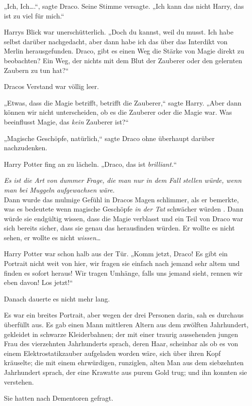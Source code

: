 {„Ich, Ich….“, sagte Draco. Seine Stimme versagte. „Ich kann das nicht Harry, das ist zu viel für mich.“

Harrys Blick war unerschütterlich. „Doch du kannst, weil du musst. Ich habe selbst darüber nachgedacht, aber dann habe ich das über das Interdikt von Merlin herausgefunden. Draco, gibt es einen Weg die Stärke von Magie direkt zu beobachten? Ein Weg, der nichts mit dem Blut der Zauberer oder den gelernten Zaubern zu tun hat?“

Dracos Verstand war völlig leer.

„Etwas, dass die Magie betrifft, betrifft die Zauberer,“ sagte Harry. „Aber dann können wir nicht unterscheiden, ob es die Zauberer oder die Magie war. Was beeinflusst Magie, das \emph{kein} Zauberer ist?“

„Magische Geschöpfe, natürlich,“ sagte Draco ohne überhaupt darüber nachzudenken.

Harry Potter fing an zu lächeln. „Draco, das ist \emph{brilliant.}“

\emph{Es ist die Art von dummer Frage, die man nur in dem Fall stellen würde, wenn man bei Muggeln aufgewachsen wäre.}\\ Dann wurde das mulmige Gefühl in Dracos Magen schlimmer, als er bemerkte, was es bedeutete wenn magische Geschöpfe \emph{in der Tat} schwächer würden . Dann würde sie endgültig wissen, dass die Magie verblasst und ein Teil von Draco war sich bereits sicher, dass sie genau das herausfinden würden. Er wollte es nicht sehen, er wollte es nicht \emph{wissen}…

Harry Potter war schon halb aus der Tür. „Komm jetzt, Draco! Es gibt ein Portrait nicht weit von hier, wir fragen sie einfach nach jemand sehr altem und finden es sofort heraus! Wir tragen Umhänge, falls uns jemand sieht, rennen wir eben davon! Los jetzt!“

Danach dauerte es nicht mehr lang.

Es war ein breites Portrait, aber wegen der drei Personen darin, sah es durchaus überfüllt aus. Es gab einen Mann mittleren Altern aus dem zwölften Jahrhundert, gekleidet in schwarze Kleiderbahnen; der mit einer traurig aussehenden jungen Frau des vierzehnten Jahrhunderts sprach, deren Haar, scheinbar als ob es von einem Elektrostatikzauber aufgeladen worden wäre, sich über ihren Kopf kräuselte; die mit einem ehrwürdigen, runziglen, alten Man aus dem siebzehnten Jahrhundert sprach, der eine Krawatte aus purem Gold trug; und ihn konnten sie verstehen.

Sie hatten nach Dementoren gefragt.

}
